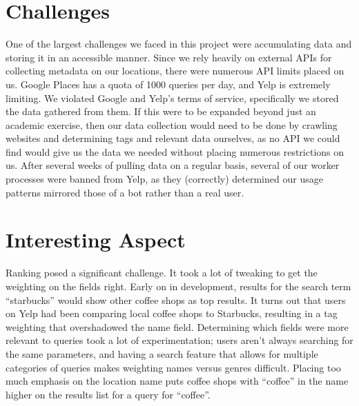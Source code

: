 \documentclass{article}
\begin{document}
\section{Challenges}
One of the largest challenges we faced in this project were accumulating data and storing it in an accessible manner. Since we rely heavily
on external APIs for collecting metadata on our locations, there were numerous API limits placed on us. Google Places has a quota of 1000 queries
per day, and Yelp is extremely limiting. We violated Google and Yelp's terms of service, specifically we stored the data gathered from them. 
If this were to be expanded beyond just an academic exercise, then our data collection would need to be done by crawling websites and determining
tags and relevant data ourselves, as no API we could find would give us the data we needed without placing numerous restrictions on us. After several
weeks of pulling data on a regular basis, several of our worker processes were banned from Yelp, as they (correctly) determined our usage
patterns mirrored those of a bot rather than a real user.

\section{Interesting Aspect}
Ranking posed a significant challenge. It took a lot of tweaking to get the weighting on the fields right. Early on in development, results for the
search term ``starbucks'' would show other coffee shops as top results. It turns out that users on Yelp had been comparing local coffee shops to
Starbucks, resulting in a tag weighting that overshadowed the name field. Determining which fields were more relevant to queries took a lot of
experimentation; users aren't always searching for the same parameters, and having a search feature that allows for multiple categories of queries
makes weighting names versus genres difficult. Placing too much emphasis on the location name puts coffee shops with ``coffee'' in the name higher
on the results list for a query for ``coffee''.
\end{document}
